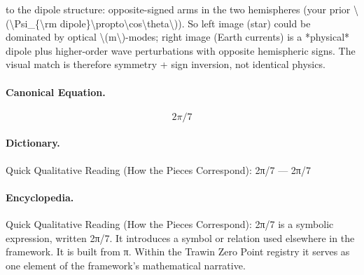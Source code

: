 to the dipole structure: opposite-signed arms in the two hemispheres (your prior \textbackslash{}(\textbackslash{}Psi\_\{\textbackslash{}rm dipole\}\textbackslash{}propto\textbackslash{}cos\textbackslash{}theta\textbackslash{})). So left image (star) could be dominated by optical \textbackslash{}(m\textbackslash{})-modes; right image (Earth currents) is a *physical* dipole plus higher-order wave perturbations with opposite hemispheric signs. The visual match is therefore symmetry + sign inversion, not identical physics.

\paragraph{Canonical Equation.}
\[
2\pi/7
\]

\paragraph{Dictionary.}
Quick Qualitative Reading (How the Pieces Correspond): 2π/7 — 2π/7

\paragraph{Encyclopedia.}
Quick Qualitative Reading (How the Pieces Correspond): 2π/7 is a symbolic expression, written 2π/7. It introduces a symbol or relation used elsewhere in the framework. It is built from π. Within the Trawin Zero Point registry it serves as one element of the framework's mathematical narrative.
